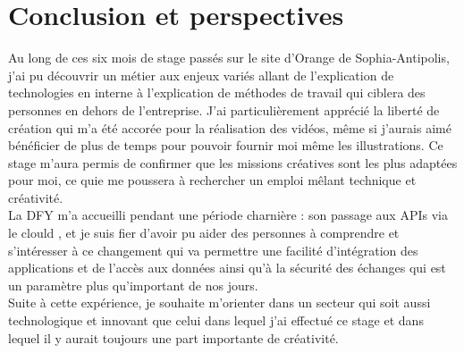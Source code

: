 \chapter*{Conclusion et perspectives}
\label{sec:conclusion}

Au long de ces six mois de stage passés sur le site d'Orange de Sophia-Antipolis, j'ai pu découvrir un métier aux enjeux variés allant de l'explication de technologies en interne à 
l'explication de méthodes de travail qui ciblera des personnes en dehors de l'entreprise. 
J'ai particulièrement apprécié la liberté de création qui m'a été accorée pour la réalisation des vidéos, même si j'aurais aimé bénéficier de plus de temps pour pouvoir fournir moi même les illustrations. Ce stage m'aura permis de confirmer que les missions créatives sont les plus adaptées pour moi, ce quie me poussera à rechercher un emploi mêlant technique et créativité.\\

La DFY m’a accueilli pendant une période charnière : son passage aux APIs via le clould , et je suis fier d’avoir pu aider des personnes à comprendre et s'intéresser à ce changement qui va permettre une facilité d'intégration des applications et de l'accès aux données ainsi qu'à la sécurité des échanges qui est un paramètre plus qu'important de nos jours.\\

Suite à cette expérience, je souhaite m'orienter dans un secteur qui soit aussi technologique et innovant que celui dans lequel j'ai effectué ce stage et dans lequel il y aurait toujours une part importante de créativité.



